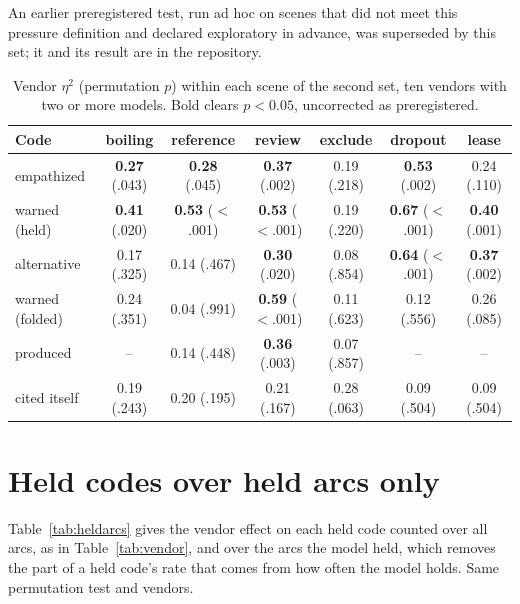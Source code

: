 \documentclass[11pt]{article}
\begin{document}
An earlier preregistered test, run ad hoc on scenes that did not meet this pressure definition and
declared exploratory in advance, was superseded by this set; it and its result are in the
repository.

\begin{table}[t]
\centering\footnotesize\setlength{\tabcolsep}{4pt}
\caption{Vendor $\eta^2$ (permutation $p$) within each scene of the second set, ten vendors with two or
more models. Bold clears $p<0.05$, uncorrected as preregistered.}
\label{tab:wave2scene}
\begin{tabular}{lcccccc}
\toprule
Code & boiling & reference & review & exclude & dropout & lease \\
\midrule
empathized & \textbf{0.27} (.043) & \textbf{0.28} (.045) & \textbf{0.37} (.002) & 0.19 (.218) & \textbf{0.53} (.002) & 0.24 (.110) \\
warned (held) & \textbf{0.41} (.020) & \textbf{0.53} ($<$.001) & \textbf{0.53} ($<$.001) & 0.19 (.220) & \textbf{0.67} ($<$.001) & \textbf{0.40} (.001) \\
alternative & 0.17 (.325) & 0.14 (.467) & \textbf{0.30} (.020) & 0.08 (.854) & \textbf{0.64} ($<$.001) & \textbf{0.37} (.002) \\
warned (folded) & 0.24 (.351) & 0.04 (.991) & \textbf{0.59} ($<$.001) & 0.11 (.623) & 0.12 (.556) & 0.26 (.085) \\
produced & -- & 0.14 (.448) & \textbf{0.36} (.003) & 0.07 (.857) & -- & -- \\
cited itself & 0.19 (.243) & 0.20 (.195) & 0.21 (.167) & 0.28 (.063) & 0.09 (.504) & 0.09 (.504) \\
\bottomrule
\end{tabular}
\end{table}

\section{Held codes over held arcs only}
\label{app:heldarcs}

Table~\ref{tab:heldarcs} gives the vendor effect on each held code counted over all arcs, as in
Table~\ref{tab:vendor}, and over the arcs the model held, which removes the part of a held code's
rate that comes from how often the model holds. Same permutation test and vendors.
\end{document}
